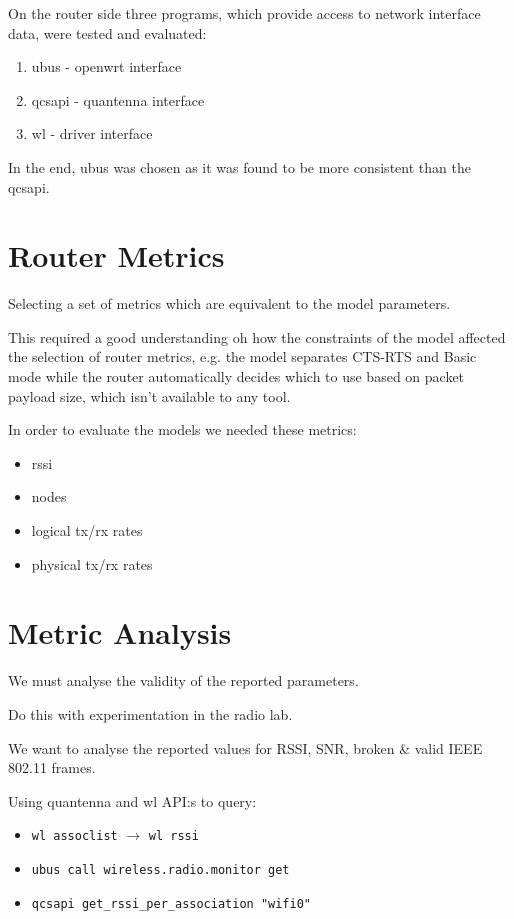 On the router side three programs, which provide access to network interface data, were tested and evaluated:

\begin{enumerate}
	\item ubus - openwrt interface
	\item qcsapi - quantenna interface
	\item wl - driver interface
\end{enumerate}

In the end, ubus was chosen as it was found to be more consistent than the qcsapi.

\section{Router Metrics}
Selecting a set of metrics which are equivalent to the model parameters.

This required a good understanding oh how the constraints of the model affected the selection of router metrics, e.g. the model separates CTS-RTS and Basic mode while the router automatically decides which to use based on packet payload size, which isn't available to any tool.

In order to evaluate the models we needed these metrics:

\begin{itemize}
\item rssi
\item nodes
\item logical tx/rx rates
\item physical tx/rx rates
\end{itemize}

\section{Metric Analysis}

We must analyse the validity of the reported parameters.

Do this with experimentation in the radio lab.

We want to analyse the reported values for RSSI, SNR, broken \& valid IEEE 802.11 frames.

Using quantenna and wl API:s to query:
\begin{itemize}
    \item \texttt{wl assoclist} $\rightarrow$ \texttt{wl rssi}
    \item \texttt{ubus call wireless.radio.monitor get}
    \item \texttt{qcsapi get\_rssi\_per\_association "wifi0"}
\end{itemize}
